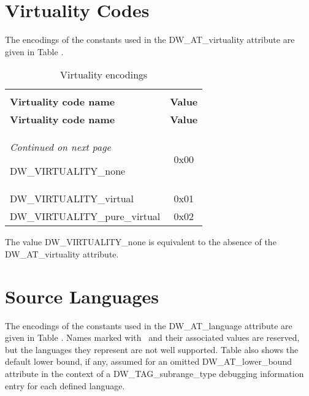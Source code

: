\section{Virtuality Codes}
\label{datarep:vitualitycodes}

The encodings of the constants used in the 
DW\_AT\_virtuality attribute are given in 
Table .

\begin{centering}
\setlength{\extrarowheight}{0.1cm}
\begin{longtable}{l|c}
  \caption{Virtuality encodings} \label{tab:virtualityencodings}\\
  \hline \\ \bfseries Virtuality code name&\bfseries Value \\ \hline
\endfirsthead
  \bfseries Virtuality code name&\bfseries Value\\ \hline
\endhead
  \hline \emph{Continued on next page}
\endfoot
  \hline
\endlastfoot

DW\_VIRTUALITY\_none&0x00 \\
DW\_VIRTUALITY\_virtual&0x01 \\
DW\_VIRTUALITY\_pure\_virtual&0x02 \\



\end{longtable}
\end{centering}

The value 
DW\_VIRTUALITY\_none is equivalent to the absence of the 
DW\_AT\_virtuality
attribute.

\section{Source Languages}
\label{datarep:sourcelanguages}

The encodings of the constants used in the DW\_AT\_language
attribute are given in 
Table .
Names marked with
\dag \  
and their associated values are reserved, but the
languages they represent are not well supported. 
Table 
also shows the default lower bound, if any, assumed for
an omitted DW\_AT\_lower\_bound attribute in the context of a
DW\_TAG\_subrange\_type debugging information entry for each
defined language.

